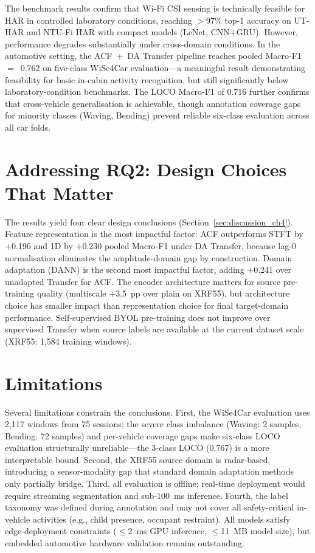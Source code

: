 \documentclass[english,bibtex]{kththesis}
\begin{document}
The benchmark results confirm that Wi-Fi CSI sensing is technically feasible for HAR in controlled laboratory conditions, reaching $>97\%$ top-1 accuracy on UT-HAR and NTU-Fi HAR with compact models (LeNet, CNN+GRU). However, performance degrades substantially under cross-domain conditions. In the automotive setting, the ACF~+~DA Transfer pipeline reaches pooled Macro-F1~$=$~0.762 on five-class WiSe4Car evaluation---a meaningful result demonstrating feasibility for basic in-cabin activity recognition, but still significantly below laboratory-condition benchmarks. The LOCO Macro-F1 of 0.716 further confirms that cross-vehicle generalisation is achievable, though annotation coverage gaps for minority classes (Waving, Bending) prevent reliable six-class evaluation across all car folds.

\section{Addressing RQ2: Design Choices That Matter}
\label{sec:rq2}

The results yield four clear design conclusions (Section~\ref{sec:discussion_ch4}). Feature representation is the most impactful factor: ACF outperforms STFT by $+$0.196 and 1D by $+$0.230 pooled Macro-F1 under DA Transfer, because lag-0 normalisation eliminates the amplitude-domain gap by construction. Domain adaptation (DANN) is the second most impactful factor, adding $+$0.241 over unadapted Transfer for ACF. The encoder architecture matters for source pre-training quality (multiscale $+$3.5~pp over plain on XRF55), but architecture choice has smaller impact than representation choice for final target-domain performance. Self-supervised BYOL pre-training does not improve over supervised Transfer when source labels are available at the current dataset scale (XRF55: 1{,}584 training windows).

\section{Limitations}
\label{sec:limitations}

Several limitations constrain the conclusions. First, the WiSe4Car evaluation uses 2{,}117 windows from 75 sessions; the severe class imbalance (Waving: 2 samples, Bending: 72 samples) and per-vehicle coverage gaps make six-class LOCO evaluation structurally unreliable---the 3-class LOCO (0.767) is a more interpretable bound. Second, the XRF55 source domain is radar-based, introducing a sensor-modality gap that standard domain adaptation methods only partially bridge. Third, all evaluation is offline; real-time deployment would require streaming segmentation and sub-100~ms inference. Fourth, the label taxonomy was defined during annotation and may not cover all safety-critical in-vehicle activities (e.g., child presence, occupant restraint). All models satisfy edge-deployment constraints ($\leq$2~ms GPU inference, $\leq$11~MB model size), but embedded automotive hardware validation remains outstanding.
\end{document}
